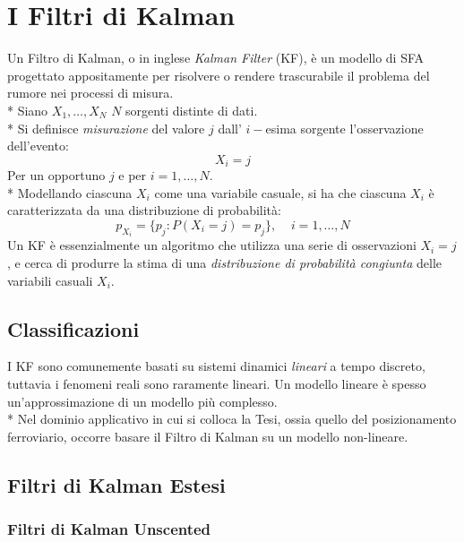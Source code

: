 \section{I Filtri di Kalman}
Un Filtro di Kalman, o in inglese \emph{Kalman Filter} (KF), \`e un modello di SFA progettato appositamente per risolvere o rendere trascurabile il problema del rumore nei processi di misura.\\*
Siano $X_1,\dots,X_N$ $N$ sorgenti distinte di dati.\\*
Si definisce \emph{misurazione} del valore $j$ dall' $i-$esima sorgente l'osservazione dell'evento:
$$
X_i = j
$$
Per un opportuno $j$ e per $i = 1,\dots,N$.\\*
Modellando ciascuna $X_i$ come una variabile casuale, si ha che ciascuna $X_i$ \`e caratterizzata da una distribuzione di probabilit\`a:
$$
p_{X_i} = \{p_j:P(X_i = j) = p_j\},\;\;\;\;i = 1,\dots,N
$$
Un KF \`e essenzialmente un algoritmo che utilizza una serie di osservazioni $X_i = j$, e cerca di produrre la stima di una \emph{distribuzione di probabilit\`a congiunta} delle variabili casuali $X_i$.
\subsection{Classificazioni}
I KF sono comunemente basati su sistemi dinamici \emph{lineari} a tempo discreto, tuttavia i fenomeni reali sono raramente lineari. Un modello lineare \`e spesso un'approssimazione di un modello pi\`u complesso.\\*
Nel dominio applicativo in cui si colloca la Tesi, ossia quello del posizionamento ferroviario, occorre basare il Filtro di Kalman su un modello non-lineare.
\subsection{Filtri di Kalman Estesi}
\subsubsection{Filtri di Kalman Unscented}